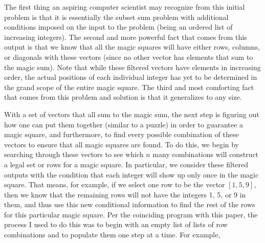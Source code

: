 \documentclass{article}
\begin{document}
    The first thing an aspiring computer scientist may recognize from this initial problem is that it is essentially the subset sum problem with additional conditions imposed on the input to the problem (being an ordered list of increasing integers). The second and more powerful fact that comes from this output is that we know that all the magic squares will have either rows, columns, or diagonals with these vectors (since no other vector has elements that sum to the magic sum). Note that while these filtered vectors have elements in increasing order, the actual positions of each individual integer has yet to be determined in the grand scope of the entire magic square. The third and most comforting fact that comes from this problem and solution is that it generalizes to any size.
     
    With a set of vectors that all sum to the magic sum, the next step is figuring out how one can put them together (similar to a puzzle) in order to guarantee a magic square, and furthermore, to find every possible combination of these vectors to ensure that all magic squares are found. To do this, we begin by searching through these vectors to see which $n$ many combinations will construct a legal set or rows for a magic square. In particular, we consider these filtered outputs with the condition that each integer will show up only once in the magic square. That means, for example, if we select one row to be the vector $[1, 5, 9]$, then we know that the remaining rows will not have the integers 1, 5, or 9 in them, and thus use this new conditional information to find the rest of the rows for this particular magic square. Per the coinciding program with this paper, the process I used to do this was to begin with an empty list of lists of row combinations and to populate them one step at a time. For example, 
\end{document}
